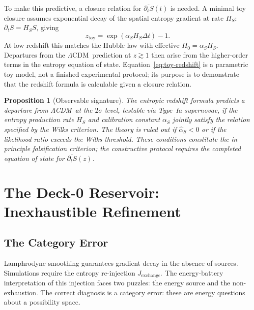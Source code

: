 \documentclass[12pt, oneside]{book}
\theoremstyle{plain}
\newtheorem{proposition}[theorem]{Proposition}
\theoremstyle{definition}
\newcommand{\LCDM}{$\Lambda$CDM}
\begin{document}
To make this predictive, a closure relation for $\overline{\partial_t S}(t)$ is
needed. A minimal toy closure assumes exponential decay of the spatial entropy
gradient at rate $H_S$: $\partial_t S = H_S S$, giving
\begin{equation}
  z_{\mathrm{toy}} = \exp(\alpha_S H_S \Delta t) - 1.
  \label{eq:toy-redshift}
\end{equation}
At low redshift this matches the Hubble law with effective $H_0 = \alpha_S H_S$.
Departures from the \LCDM\ prediction at $z\gtrsim 1$ then arise from the
higher-order terms in the entropy equation of state. Equation~\eqref{eq:toy-redshift}
is a parametric toy model, not a finished experimental protocol; its purpose is to
demonstrate that the redshift formula is calculable given a closure relation.

\begin{proposition}[Observable signature]
The entropic redshift formula predicts a departure from \LCDM\ at the $2\sigma$ level,
testable via Type~Ia supernovae, if the entropy production rate $H_S$ and calibration
constant $\alpha_S$ jointly satisfy the relation specified by the Wilks criterion.
The theory is ruled out if $\hat{\alpha}_S < 0$ or if the likelihood ratio exceeds
the Wilks threshold. These conditions constitute the in-principle falsification
criterion; the constructive protocol requires the completed equation of state for
$\overline{\partial_t S}(z)$.
\end{proposition}

\chapter{The Deck-0 Reservoir: Inexhaustible Refinement}
\label{ch:deck0}

\section{The Category Error}
\label{sec:category-error}

Lamphrodyne smoothing guarantees gradient decay in the absence of sources. Simulations
require the entropy re-injection $J_{\mathrm{exchange}}$. The energy-battery
interpretation of this injection faces two puzzles: the energy source and the
non-exhaustion. The correct diagnosis is a category error: these are energy questions
about a possibility space.
\end{document}
